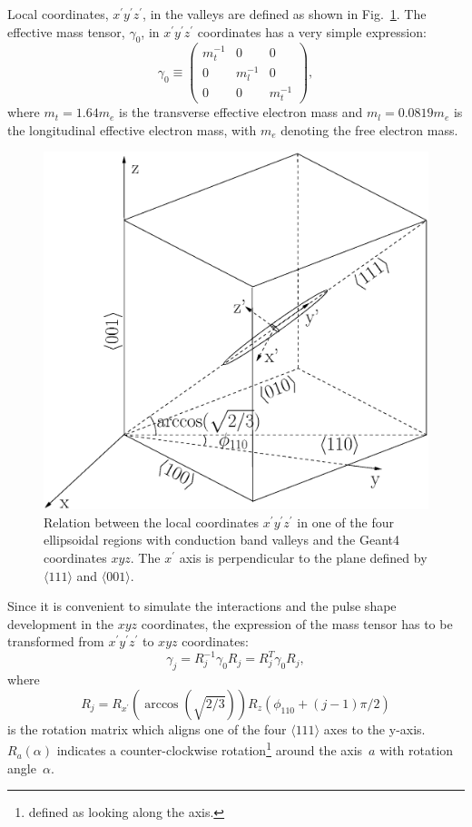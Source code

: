 \documentclass[epj]{svjour}
\begin{document}
Local coordinates, $x^{\prime} y^{\prime} z^{\prime}$, in the valleys
are defined as shown in Fig.~\ref{f:axes}. The effective mass tensor,
$\gamma_{0}$, in $x^{\prime} y^{\prime} z^{\prime}$ coordinates has a
very simple expression:
\begin{equation} 
\label{e:g0} 
\gamma_{0} \equiv \left( 
\begin{array}{ccc} 
m_{t}^{-1} & 0 & 0 \\ 
0 & m_{l}^{-1} & 0 \\ 
0 & 0 & m_{t}^{-1} 
\end{array} \right), 
\end{equation} 
where $m_{t} = 1.64m_{e}$ is the transverse effective electron mass
and $m_{l} = 0.0819m_{e}$ is the longitudinal effective electron mass,
with $m_{e}$ denoting the free electron mass. 
 
\begin{figure}[htpb]
\centering
\includegraphics[width=0.7\linewidth]{axes}   
\caption{Relation between the local coordinates
$x^{\prime}y^{\prime}z^{\prime}$ in one of the four ellipsoidal
regions with conduction band valleys and the Geant4 coordinates
$xyz$. The $x^{\prime}$ axis is perpendicular to the plane defined by
$\langle111\rangle$ and $\langle001\rangle$.}
\label{f:axes} 
\end{figure} 

Since it is convenient to simulate the interactions and the pulse
shape development in the $xyz$ coordinates, the expression of the mass
tensor has to be transformed from $x^{\prime} y^{\prime} z^{\prime}$
to $xyz$ coordinates:
\begin{equation} 
\label{e:gs} 
\gamma_{j} = R_{j}^{-1}\gamma_{0}R_{j} = R_{j}^{T}\gamma_{0}R_{j}, 
\end{equation} 
where 
\begin{equation} 
\label{e:rs} 
R_{j} = R_{x^{\prime}}(\arccos(\sqrt{2/3}))R_{z}(\phi_{110}+(j-1)\pi/2) 
\end{equation} 
is the rotation matrix which aligns one of the four $\langle 111
\rangle$ axes to the y-axis. $R_a(\alpha)$ indicates a
counter-clockwise rotation\footnote{defined as looking along the
axis.} around the axis~$a$ with rotation angle~$\alpha$.
 
\end{document}
